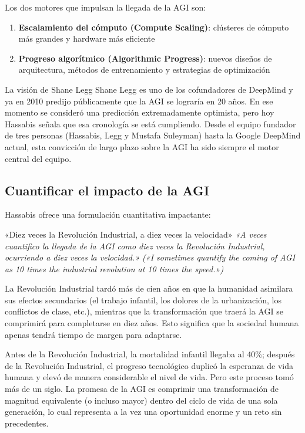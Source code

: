 Los dos motores que impulsan la llegada de la AGI son:
\begin{enumerate}
    \item \textbf{Escalamiento del cómputo (Compute Scaling)}: clústeres de cómputo más grandes y hardware más eficiente
    \item \textbf{Progreso algorítmico (Algorithmic Progress)}: nuevos diseños de arquitectura, métodos de entrenamiento y estrategias de optimización
\end{enumerate}

\begin{knowledgebox}{La visión de Shane Legg}
Shane Legg es uno de los cofundadores de DeepMind y ya en 2010 predijo públicamente que la AGI se lograría en 20 años. En ese momento se consideró una predicción extremadamente optimista, pero hoy Hassabis señala que esa cronología se está cumpliendo. Desde el equipo fundador de tres personas (Hassabis, Legg y Mustafa Suleyman) hasta la Google DeepMind actual, esta convicción de largo plazo sobre la AGI ha sido siempre el motor central del equipo.
\end{knowledgebox}

\subsection{Cuantificar el impacto de la AGI}

Hassabis ofrece una formulación cuantitativa impactante:

\begin{importantbox}{«Diez veces la Revolución Industrial, a diez veces la velocidad»}
\textit{«A veces cuantifico la llegada de la AGI como diez veces la Revolución Industrial, ocurriendo a diez veces la velocidad.» («I sometimes quantify the coming of AGI as 10 times the industrial revolution at 10 times the speed.»)}

La Revolución Industrial tardó más de cien años en que la humanidad asimilara sus efectos secundarios (el trabajo infantil, los dolores de la urbanización, los conflictos de clase, etc.), mientras que la transformación que traerá la AGI se comprimirá para completarse en diez años. Esto significa que la sociedad humana apenas tendrá tiempo de margen para adaptarse.
\end{importantbox}

Antes de la Revolución Industrial, la mortalidad infantil llegaba al 40\%; después de la Revolución Industrial, el progreso tecnológico duplicó la esperanza de vida humana y elevó de manera considerable el nivel de vida. Pero este proceso tomó más de un siglo. La promesa de la AGI es comprimir una transformación de magnitud equivalente (o incluso mayor) dentro del ciclo de vida de una sola generación, lo cual representa a la vez una oportunidad enorme y un reto sin precedentes.

